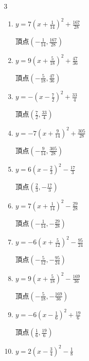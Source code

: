 \begin{multicols}{3}
\begin{enumerate}
  \item $\displaystyle y=7\left( x+\frac{1}{14}\right)^{2}+\frac{167}{28}$

        $\displaystyle 頂点\left( -\frac{1}{14} , \frac{167}{28} \right)$

  \item $\displaystyle y=9\left( x+\frac{5}{18}\right)^{2}+\frac{47}{36}$

        $\displaystyle 頂点\left( -\frac{5}{18} , \frac{47}{36} \right)$

  \item $\displaystyle y=-\left( x-\frac{7}{2}\right)^{2}+\frac{33}{4}$

        $\displaystyle 頂点\left( \frac{7}{2} , \frac{33}{4} \right)$

  \item $\displaystyle y=-7\left( x+\frac{9}{14}\right)^{2}+\frac{305}{28}$

        $\displaystyle 頂点\left( -\frac{9}{14} , \frac{305}{28} \right)$

  \item $\displaystyle y=6\left( x-\frac{2}{3}\right)^{2}-\frac{17}{3}$

        $\displaystyle 頂点\left( \frac{2}{3} , -\frac{17}{3} \right)$

\columnbreak %

  \item $\displaystyle y=7\left( x+\frac{1}{14}\right)^{2}-\frac{29}{28}$

        $\displaystyle 頂点\left( -\frac{1}{14} , -\frac{29}{28} \right)$

  \item $\displaystyle y=-6\left( x+\frac{5}{12}\right)^{2}-\frac{95}{24}$

        $\displaystyle 頂点\left( -\frac{5}{12} , -\frac{95}{24} \right)$

  \item $\displaystyle y=9\left( x+\frac{5}{18}\right)^{2}-\frac{169}{36}$

        $\displaystyle 頂点\left( -\frac{5}{18} , -\frac{169}{36} \right)$

  \item $\displaystyle y=-6\left( x-\frac{1}{6}\right)^{2}+\frac{19}{6}$

        $\displaystyle 頂点\left( \frac{1}{6} , \frac{19}{6} \right)$

  \item $\displaystyle y=2\left( x-\frac{3}{4}\right)^{2}-\frac{1}{8}$


\end{enumerate}
\end{multicols}
